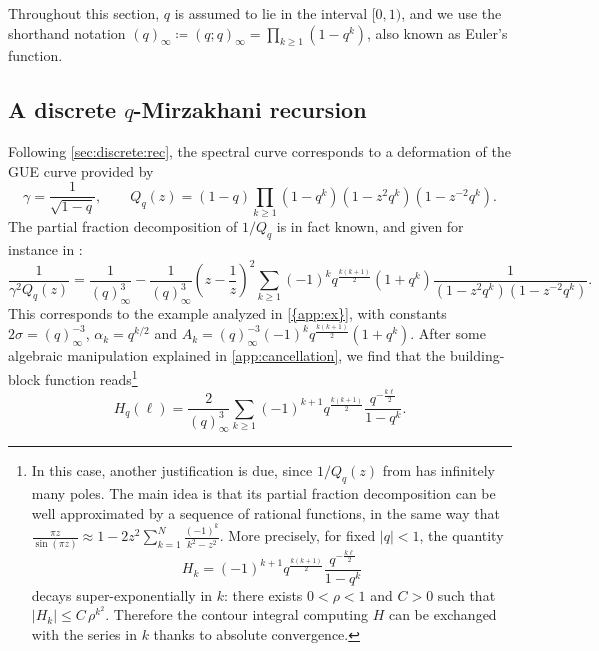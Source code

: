 \documentclass[a4paper,11pt,english]{article}
\theoremstyle{plain}
\theoremstyle{definition}
\theoremstyle{plain}
\begin{document}
Throughout this section, $q$ is assumed to lie in the interval $[0,1)$, and we use the shorthand notation $(q)_\infty \coloneqq (q;q)_\infty = \prod_{k \ge 1} (1-q^k)$, also known as Euler's function.

\subsection{A discrete \texorpdfstring{$q$}{q}-Mirzakhani recursion}
Following \cref{sec:discrete:rec}, the spectral curve  corresponds to a deformation of the GUE curve provided by
\begin{equation}
    \gamma
    = \frac{1}{\sqrt{1-q}},
    \qquad
	Q_q(z)
    =
    (1-q) \prod_{k \ge 1} (1-q^k)(1-z^2q^k)(1-z^{-2}q^k) .
\end{equation}
The partial fraction decomposition of $1/Q_q$ is in fact known, and given for instance in \cite[page~136]{TM02}:
\begin{equation}\label{eq:Qq}
	\frac{1}{\gamma^2 Q_q(z)}
	=
	\frac{1}{(q)_{\infty}^{3}}
	-
	\frac{1}{(q)_{\infty}^{3}} \left( z - \frac{1}{z} \right)^2
	\sum_{k \ge 1}
		(-1)^k
		q^{\frac{k(k+1)}{2}} (1 + q^k) 
		\frac{1}{( 1 - z^2 q^k ) ( 1 - z^{-2} q^k )}.
\end{equation}
This corresponds to the example analyzed in \cref{{app:ex}}, with constants $2\sigma = (q)_{\infty}^{-3}$, $\alpha_k = q^{k/2}$ and $A_k = (q)_{\infty}^{-3} (-1)^k q^{\frac{k(k+1)}{2}} (1 + q^k)$. After some algebraic manipulation explained in \cref{app:cancellation}, we find that the building-block function reads\footnote{
    In this case, another justification is due, since $1/Q_{q}(z)$ from  has infinitely many poles. The main idea is that its partial fraction decomposition can be well approximated by a sequence of rational functions, in the same way that $\frac{\pi z}{\sin(\pi z)} \approx 1 -2z^2\sum_{k=1}^N \frac{(-1)^k}{k^2 - z^2}$. More precisely, for fixed $|q| < 1$, the quantity
    \begin{equation*}
	   H_k
	   =
	   (-1)^{k+1} q^{\frac{k(k+1)}{2}}
		\frac{q^{-\frac{k\ell}{2}}}{1 - q^k}
    \end{equation*}
    decays super-exponentially in $k$: there exists $0 < \rho < 1$ and $C>0$ such that $|H_k| \le C \, \rho^{k^2}$. Therefore the contour integral computing $H$ can be exchanged with the series in $k$ thanks to absolute convergence.
}
\begin{equation}\label{eq:H:qWP}
	H_q(\ell)
	=
	\frac{2}{(q)_{\infty}^{3}}
    \sum_{k \ge 1}
		(-1)^{k+1} q^{\frac{k(k+1)}{2}}
		\frac{q^{-\frac{k\ell}{2}}}{1 - q^k} .
\end{equation}
\end{document}
